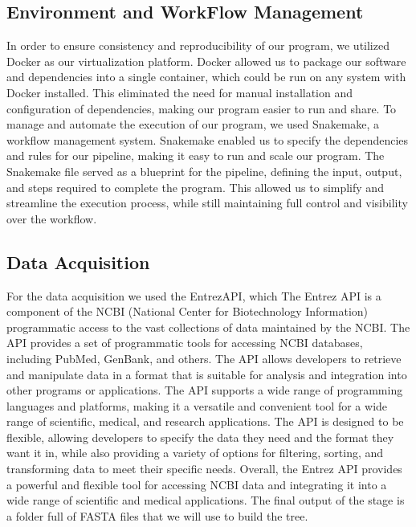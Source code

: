\documentclass[12pt]{article}
\begin{document}
\subsection{Environment and WorkFlow Management}
In order to ensure consistency and reproducibility of our program, we utilized Docker as our virtualization platform. Docker allowed us to package our software and dependencies into a single container, which could be run on any system with Docker installed. This eliminated the need for manual installation and configuration of dependencies, making our program easier to run and share.\newline
To manage and automate the execution of our program, we used Snakemake, a workflow management system. Snakemake enabled us to specify the dependencies and rules for our pipeline, making it easy to run and scale our program. The Snakemake file served as a blueprint for the pipeline, defining the input, output, and steps required to complete the program. This allowed us to simplify and streamline the execution process, while still maintaining full control and visibility over the workflow.\newpage

\subsection{Data Acquisition}
For the data acquisition we used the EntrezAPI, which The Entrez API is a component of the NCBI (National Center for Biotechnology Information) programmatic access to the vast collections of data maintained by the NCBI. The API provides a set of programmatic tools for accessing NCBI databases, including PubMed, GenBank, and others. The API allows developers to retrieve and manipulate data in a format that is suitable for analysis and integration into other programs or applications. The API supports a wide range of programming languages and platforms, making it a versatile and convenient tool for a wide range of scientific, medical, and research applications. The API is designed to be flexible, allowing developers to specify the data they need and the format they want it in, while also providing a variety of options for filtering, sorting, and transforming data to meet their specific needs. Overall, the Entrez API provides a powerful and flexible tool for accessing NCBI data and integrating it into a wide range of scientific and medical applications.\newline
The final output of the stage is a folder full of FASTA files that we will use to build the tree.
\end{document}
